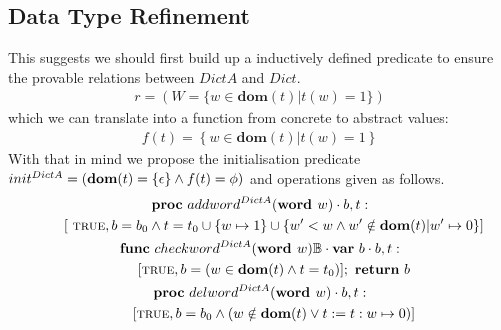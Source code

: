 \documentclass[a4paper,12pt,fleqn]{scrartcl}
\newcommand{\domt}{\textbf{dom}(t)}
\newcommand{\WORD}{\textbf{word }}
\begin{document}
\subsection{Data Type Refinement}
This suggests we should first build up a inductively defined predicate to ensure
 the provable relations between
$DictA$ and $Dict$.
\begin{gather*}
    r = (W = 
    \{ 
        w \in \domt| t(w)=1
    \})
\end{gather*}
which we can translate into a function from concrete to abstract values:
\begin{gather*}
    f(t) = 
    \left\{
        w \in  \domt | t(w) = 1
    \right\}
\end{gather*}
With that in mind we propose the initialisation predicate 
$init^{DictA} = (\domt =\{\epsilon\} \And f(t)= \phi )$ and operations given as follows.
\begin{gather*}
    \PROC\ addword^{DictA}(\WORD w)\cdot b, t:\\
        \qquad [ \ \True, b = b_0\And t = t_0\cup \{w\mapsto 1\}\cup
        \{
            w' < w \And w' \notin \domt | w' \mapsto 0
        \}]\\
    \FUNC\ checkword^{DictA}(\WORD w) \mathbb{B}\cdot
        \VAR\ b\cdot b, t:\\
        \qquad[\True, b = (w\in \domt\And t = t_0)];\ \RETURN\ b\\
    \PROC\ delword^{DictA}(\WORD w)\cdot b, t:\\
        \qquad[\True , b = b_0\And
        (w \notin \domt \OR t\Ass t: w \mapsto 0)]\\ 
\end{gather*} 
\end{document}
